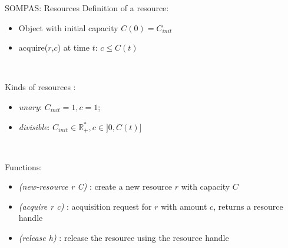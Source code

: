 \begin{frame}[t]{SOMPAS: Resources}
    Definition of a resource:
    \begin{itemize}
        \item Object with initial capacity $C(0) = C_{init} $
        \item acquire($r$,$c$) at time $t$: $c \leq C(t)$ 
    \end{itemize}

    ~~

    Kinds of resources : 
    \begin{itemize}
        \item \emph{unary}: $C_{init} = 1, c = 1$;
        \item \emph{divisible}: $C_{init} \in  \mathbb{R}_+^*, c \in ]0, C(t)]$
    \end{itemize}

    ~~

    Functions:
    \begin{itemize}
        \item \textit{(new-resource r C)} : create a new resource $r$ with capacity $C$
        \item \emph{(acquire r c)} : acquisition request for $r$ with amount $c$, returns a resource handle
        \item \emph{(release h)} : release the resource using the resource handle
    \end{itemize}

\end{frame}

